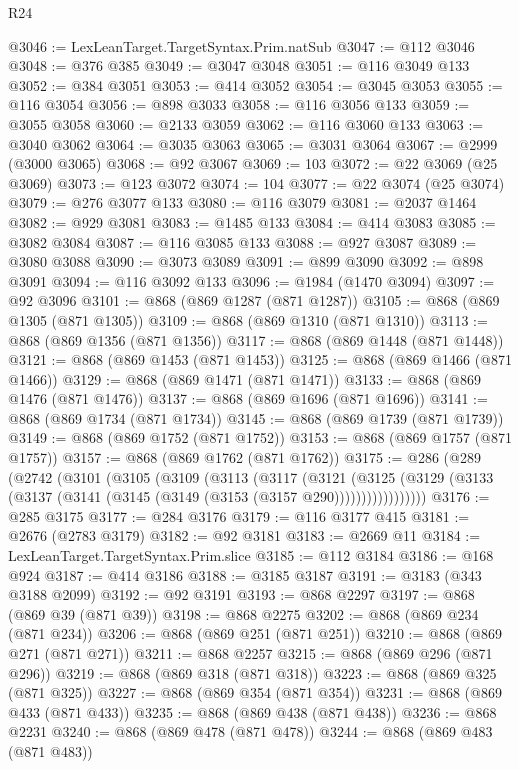 \begin{lexlean}{R24}
\begin{coremodule}
{{{{{{{{{{{{{{{{{{{{{{{{{{{{{{{{{{{{{{{{{{{{{{{{{{{{{{{{{{{{{{{{{{{{{{{{{{{{{{{{{{{{{{{{{{{{{{{{{{{{{{{{{{{{{{{{{{{{{{{{{{{{{{{{{{{{{{{{{{{{{{{{{{{{{{{{{{{{{{{{{{{{{{{{{{{{{{{{{{{{{{{{{{{{{{{{{{{@3046 := LexLeanTarget.TargetSyntax.Prim.natSub
@3047 := @112 @3046
@3048 := @376 @385
@3049 := @3047 @3048
@3051 := @116 @3049 @133
@3052 := @384 @3051
@3053 := @414 @3052
@3054 := @3045 @3053
@3055 := @116 @3054
@3056 := @898 @3033
@3058 := @116 @3056 @133
@3059 := @3055 @3058
@3060 := @2133 @3059
@3062 := @116 @3060 @133
@3063 := @3040 @3062
@3064 := @3035 @3063
@3065 := @3031 @3064
@3067 := @2999 (@3000 @3065)
@3068 := @92 @3067
@3069 := 103
@3072 := @22 @3069 (@25 @3069)
@3073 := @123 @3072
@3074 := 104
@3077 := @22 @3074 (@25 @3074)
@3079 := @276 @3077 @133
@3080 := @116 @3079
@3081 := @2037 @1464
@3082 := @929 @3081
@3083 := @1485 @133
@3084 := @414 @3083
@3085 := @3082 @3084
@3087 := @116 @3085 @133
@3088 := @927 @3087
@3089 := @3080 @3088
@3090 := @3073 @3089
@3091 := @899 @3090
@3092 := @898 @3091
@3094 := @116 @3092 @133
@3096 := @1984 (@1470 @3094)
@3097 := @92 @3096
@3101 := @868 (@869 @1287 (@871 @1287))
@3105 := @868 (@869 @1305 (@871 @1305))
@3109 := @868 (@869 @1310 (@871 @1310))
@3113 := @868 (@869 @1356 (@871 @1356))
@3117 := @868 (@869 @1448 (@871 @1448))
@3121 := @868 (@869 @1453 (@871 @1453))
@3125 := @868 (@869 @1466 (@871 @1466))
@3129 := @868 (@869 @1471 (@871 @1471))
@3133 := @868 (@869 @1476 (@871 @1476))
@3137 := @868 (@869 @1696 (@871 @1696))
@3141 := @868 (@869 @1734 (@871 @1734))
@3145 := @868 (@869 @1739 (@871 @1739))
@3149 := @868 (@869 @1752 (@871 @1752))
@3153 := @868 (@869 @1757 (@871 @1757))
@3157 := @868 (@869 @1762 (@871 @1762))
@3175 := @286
    (@289
      (@2742
        (@3101
          (@3105
            (@3109
              (@3113
                (@3117
                  (@3121
                    (@3125
                      (@3129 (@3133 (@3137 (@3141 (@3145 (@3149 (@3153 (@3157 @290)))))))))))))))))
@3176 := @285 @3175
@3177 := @284 @3176
@3179 := @116 @3177 @415
@3181 := @2676 (@2783 @3179)
@3182 := @92 @3181
@3183 := @2669 @11
@3184 := LexLeanTarget.TargetSyntax.Prim.slice
@3185 := @112 @3184
@3186 := @168 @924
@3187 := @414 @3186
@3188 := @3185 @3187
@3191 := @3183 (@343 @3188 @2099)
@3192 := @92 @3191
@3193 := @868 @2297
@3197 := @868 (@869 @39 (@871 @39))
@3198 := @868 @2275
@3202 := @868 (@869 @234 (@871 @234))
@3206 := @868 (@869 @251 (@871 @251))
@3210 := @868 (@869 @271 (@871 @271))
@3211 := @868 @2257
@3215 := @868 (@869 @296 (@871 @296))
@3219 := @868 (@869 @318 (@871 @318))
@3223 := @868 (@869 @325 (@871 @325))
@3227 := @868 (@869 @354 (@871 @354))
@3231 := @868 (@869 @433 (@871 @433))
@3235 := @868 (@869 @438 (@871 @438))
@3236 := @868 @2231
@3240 := @868 (@869 @478 (@871 @478))
@3244 := @868 (@869 @483 (@871 @483))
}}}}}}}}}}}}}}}}}}}}}}}}}}}}}}}}}}}}}}}}}}}}}}}}}}}}}}}}}}}}}}}}}}}}}}}}}}}}}}}}}}}}}}}}}}}}}}}}}}}}}}}}}}}}}}}}}}}}}}}}}}}}}}}}}}}}}}}}}}}}}}}}}}}}}}}}}}}}}}}}}}}}}}}}}}}}}}}}}}}}}}}}}}}}}}}}}}}
\end{coremodule}
\end{lexlean}
